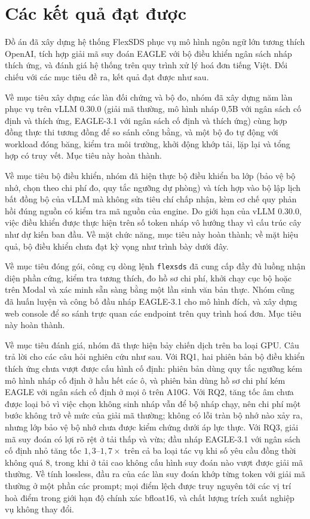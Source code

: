 
\section*{Các kết quả đạt được}

Đồ án đã xây dựng hệ thống FlexSDS phục vụ mô hình ngôn ngữ lớn tương thích OpenAI, tích hợp giải mã suy đoán EAGLE với bộ điều khiển ngân sách nháp thích ứng, và đánh giá hệ thống trên quy trình xử lý hoá đơn tiếng Việt. Đối chiếu với các mục tiêu đề ra, kết quả đạt được như sau.

Về mục tiêu xây dựng các làn đối chứng và bộ đo, nhóm đã xây dựng năm làn phục vụ trên vLLM 0.30.0 (giải mã thường, mô hình nháp 0,5B với ngân sách cố định và thích ứng, EAGLE-3.1 với ngân sách cố định và thích ứng) cùng hợp đồng thực thi tương đồng để so sánh công bằng, và một bộ đo tự động với workload đóng băng, kiểm tra môi trường, khởi động khớp tải, lặp lại và tổng hợp có truy vết. Mục tiêu này hoàn thành.

Về mục tiêu bộ điều khiển, nhóm đã hiện thực bộ điều khiển ba lớp (bảo vệ bộ nhớ, chọn theo chi phí đo, quy tắc ngưỡng dự phòng) và tích hợp vào bộ lập lịch bất đồng bộ của vLLM mà không sửa tiêu chí chấp nhận, kèm cơ chế quy phản hồi đúng nguồn có kiểm tra mã nguồn của engine. Do giới hạn của vLLM 0.30.0, việc điều khiển được thực hiện trên số token nháp vô hướng thay vì cấu trúc cây như dự kiến ban đầu. Về mặt chức năng, mục tiêu này hoàn thành; về mặt hiệu quả, bộ điều khiển chưa đạt kỳ vọng như trình bày dưới đây.

Về mục tiêu đóng gói, công cụ dòng lệnh \texttt{flexsds} đã cung cấp đầy đủ luồng nhận diện phần cứng, kiểm tra tương thích, đo hồ sơ chi phí, khởi chạy cục bộ hoặc trên Modal và xác minh sẵn sàng bằng một lần sinh văn bản thực. Nhóm cũng đã huấn luyện và công bố đầu nháp EAGLE-3.1 cho mô hình đích, và xây dựng web console để so sánh trực quan các endpoint trên quy trình hoá đơn. Mục tiêu này hoàn thành.

Về mục tiêu đánh giá, nhóm đã thực hiện bảy chiến dịch trên ba loại GPU. Câu trả lời cho các câu hỏi nghiên cứu như sau. Với RQ1, hai phiên bản bộ điều khiển thích ứng chưa vượt được cấu hình cố định: phiên bản dùng quy tắc ngưỡng kém mô hình nháp cố định ở hầu hết các ô, và phiên bản dùng hồ sơ chi phí kém EAGLE với ngân sách cố định ở mọi ô trên A10G. Với RQ2, tăng tốc âm chưa được loại bỏ vì việc chọn không sinh nháp vẫn để bộ nháp chạy, nên chi phí một bước không trở về mức của giải mã thường; không có lỗi tràn bộ nhớ nào xảy ra, nhưng lớp bảo vệ bộ nhớ chưa được kiểm chứng dưới áp lực thực. Với RQ3, giải mã suy đoán có lợi rõ rệt ở tải thấp và vừa; đầu nháp EAGLE-3.1 với ngân sách cố định nhỏ tăng tốc $1{,}3$--$1{,}7\times$ trên cả ba loại tác vụ khi số yêu cầu đồng thời không quá 8, trong khi ở tải cao không cấu hình suy đoán nào vượt được giải mã thường. Về tính lossless, đầu ra của các làn suy đoán khớp từng token với giải mã thường ở một phần các prompt; mọi điểm lệch được truy nguyên tới các vị trí hoà điểm trong giới hạn độ chính xác bfloat16, và chất lượng trích xuất nghiệp vụ không thay đổi.

